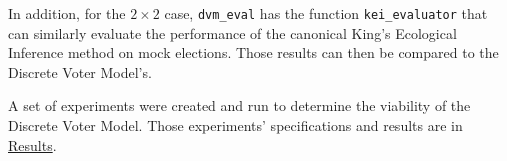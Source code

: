 In addition, for the $2 \times 2$ case, \texttt{dvm\_eval} has the function \texttt{kei\_evaluator} that can similarly evaluate the performance of the canonical King's Ecological Inference method on mock elections. Those results can then be compared to the Discrete Voter Model's.

A set of experiments were created and run to determine the viability of the Discrete Voter Model. Those experiments' specifications and results are in \hyperref[chap:results]{Results}.
